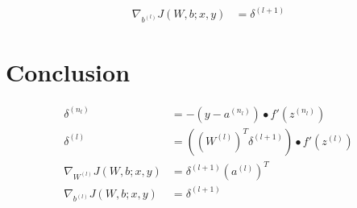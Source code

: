 \documentclass{article}
\begin{document}
	\begin{equation}
		\begin{aligned}
			\nabla_{b^{(l)}} J(W, b; x, y) &= \delta^{(l+1)} 
		\end{aligned}
	\end{equation}
	
	\section{Conclusion}
	\begin{align}
		\delta^{(n_l)} &= - (y - a^{(n_l)}) \bullet f'(z^{(n_l)}) \\
		\delta^{(l)} &= ((W^{(l)})^T \delta^{(l+1)}) \bullet f'(z^{(l)}) \\
		\nabla_{W^{(l)}} J(W, b; x, y) &= \delta^{(l+1)}(a^{(l)})^T \\
		\nabla_{b^{(l)}} J(W, b; x, y) &= \delta^{(l+1)} 
	\end{align}
\end{document}
